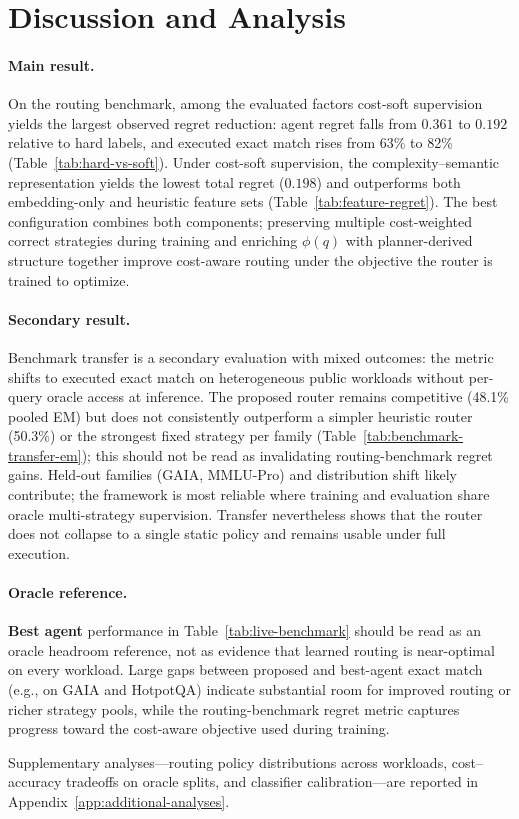 \section{Discussion and Analysis}
\label{app:discussion}

\paragraph{Main result.}
On the routing benchmark, among the evaluated factors cost-soft supervision yields the largest
observed regret reduction: agent regret falls from $0.361$ to $0.192$ relative to hard labels,
and executed exact match rises from 63\% to 82\% (Table~\ref{tab:hard-vs-soft}).
Under cost-soft supervision, the complexity--semantic representation yields the lowest total
regret ($0.198$) and outperforms both embedding-only and heuristic feature sets
(Table~\ref{tab:feature-regret}).
The best configuration combines both components; preserving multiple cost-weighted correct
strategies during training and enriching $\phi(q)$ with planner-derived structure together
improve cost-aware routing under the objective the router is trained to optimize.

\paragraph{Secondary result.}
Benchmark transfer is a secondary evaluation with mixed outcomes: the metric shifts to
executed exact match on heterogeneous public workloads without per-query oracle access
at inference.
The proposed router remains competitive (48.1\% pooled EM) but does not consistently
outperform a simpler heuristic router (50.3\%) or the strongest fixed strategy per family
(Table~\ref{tab:benchmark-transfer-em}); this should not be read as invalidating
routing-benchmark regret gains.
Held-out families (GAIA, MMLU-Pro) and distribution shift likely contribute; the framework
is most reliable where training and evaluation share oracle multi-strategy supervision.
Transfer nevertheless shows that the router does not collapse to a single static policy and
remains usable under full execution.

\paragraph{Oracle reference.}
\textbf{Best agent} performance in Table~\ref{tab:live-benchmark} should be read as an
oracle headroom reference, not as evidence that learned routing is near-optimal on every
workload.
Large gaps between proposed and best-agent exact match (e.g., on GAIA and HotpotQA) indicate
substantial room for improved routing or richer strategy pools, while the routing-benchmark
regret metric captures progress toward the cost-aware objective used during training.

Supplementary analyses---routing policy distributions across workloads, cost--accuracy
tradeoffs on oracle splits, and classifier calibration---are reported in
Appendix~\ref{app:additional-analyses}.
